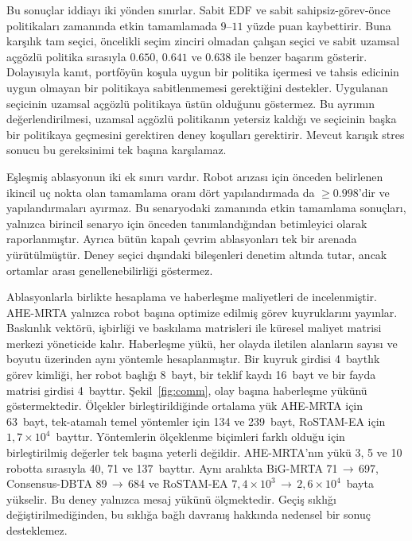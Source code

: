 \documentclass[10pt,letterpaper,onecolumn]{IEEEtran}
\begin{document}
Bu sonuçlar iddiayı iki yönden sınırlar. Sabit EDF ve sabit sahipsiz-görev-önce
politikaları zamanında etkin tamamlamada $9$--$11$ yüzde puan kaybettirir.
Buna karşılık tam seçici, öncelikli seçim zinciri olmadan çalışan seçici ve
sabit uzamsal açgözlü politika sırasıyla $0.650$, $0.641$ ve $0.638$ ile benzer
başarım gösterir. Dolayısıyla
kanıt, portföyün koşula uygun bir politika içermesi ve tahsis edicinin uygun
olmayan bir politikaya sabitlenmemesi gerektiğini destekler. Uygulanan
seçicinin uzamsal açgözlü politikaya üstün olduğunu göstermez. Bu ayrımın
değerlendirilmesi, uzamsal açgözlü politikanın yetersiz kaldığı ve seçicinin
başka bir politikaya geçmesini gerektiren deney koşulları gerektirir. Mevcut
karışık stres sonucu bu gereksinimi tek başına karşılamaz.

Eşleşmiş ablasyonun iki ek sınırı vardır. Robot arızası için önceden belirlenen
ikincil uç nokta olan tamamlama oranı dört yapılandırmada da $\geq0.998$'dir ve
yapılandırmaları ayırmaz. Bu senaryodaki zamanında etkin tamamlama sonuçları,
yalnızca birincil senaryo için önceden tanımlandığından betimleyici olarak
raporlanmıştır. Ayrıca bütün kapalı çevrim ablasyonları tek bir arenada
yürütülmüştür. Deney seçici dışındaki bileşenleri denetim altında tutar, ancak
ortamlar arası genellenebilirliği göstermez.

Ablasyonlarla birlikte hesaplama ve haberleşme maliyetleri de incelenmiştir.
AHE-MRTA yalnızca robot başına optimize edilmiş görev kuyruklarını yayınlar.
Baskınlık vektörü, işbirliği ve baskılama matrisleri ile küresel maliyet matrisi
merkezi yöneticide kalır. Haberleşme yükü, her olayda iletilen alanların sayısı
ve boyutu üzerinden aynı yöntemle hesaplanmıştır. Bir kuyruk girdisi 4~baytlık
görev kimliği, her robot başlığı 8~bayt, bir teklif kaydı 16~bayt ve bir fayda
matrisi girdisi 4~bayttır. Şekil~\ref{fig:comm}, olay başına haberleşme yükünü
göstermektedir. Ölçekler birleştirildiğinde ortalama yük AHE-MRTA için 63~bayt,
tek-atamalı temel yöntemler için 134 ve 239~bayt, RoSTAM-EA için
$1{,}7{\times}10^{4}$~bayttır. Yöntemlerin ölçeklenme biçimleri farklı olduğu
için birleştirilmiş değerler tek başına yeterli değildir. AHE-MRTA'nın yükü 3,
5 ve 10 robotta sırasıyla 40, 71 ve 137~bayttır. Aynı aralıkta BiG-MRTA
71\,$\to$\,697, Consensus-DBTA 89\,$\to$\,684 ve RoSTAM-EA
$7{,}4{\times}10^{3}$\,$\to$\,$2{,}6{\times}10^{4}$~bayta yükselir. Bu deney
yalnızca mesaj yükünü ölçmektedir. Geçiş sıklığı değiştirilmediğinden, bu
sıklığa bağlı davranış hakkında nedensel bir sonuç desteklemez.
\end{document}
